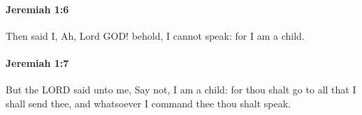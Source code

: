		\paragraph{Jeremiah 1:6} %
			\label{JEREMIAH-1-6}

			Then said I, Ah, Lord GOD! behold, I cannot speak: for I am a child.


		\paragraph{Jeremiah 1:7} %
			\label{JEREMIAH-1-7}

			But the LORD said unto me, Say not, I am a child: for thou shalt go to all that I shall send thee, and whatsoever I command thee thou shalt speak.


